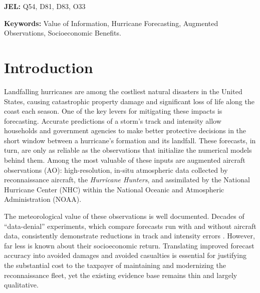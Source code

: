 \documentclass[12pt]{article}%
\begin{document}
\begin{titlepage}


\noindent\textbf{JEL:} Q54, D81, D83, O33

\vspace{.6cm}

\noindent\textbf{Keywords:} Value of Information, Hurricane Forecasting, Augmented Observations, Socioeconomic Benefits.
\setcounter{footnote}{0}


\end{titlepage}

\newpage
 \FloatBarrier
\section{Introduction} \label{sec:intro}

Landfalling hurricanes are among the costliest natural disasters in the United States, causing catastrophic property damage and significant loss of life along the coast each season. One of the key levers for mitigating these impacts is forecasting. Accurate predictions of a storm's track and intensity allow households and government agencies to make better protective decisions in the short window between a hurricane's formation and its landfall. These forecasts, in turn, are only as reliable as the observations that initialize the numerical models behind them. Among the most valuable of these inputs are augmented aircraft observations (AO): high-resolution, in-situ atmospheric data collected by reconnaissance aircraft, the \emph{Hurricane Hunters}, and assimilated by the National Hurricane Center (NHC) within the National Oceanic and Atmospheric Administration (NOAA).

The meteorological value of these observations is well documented. Decades of ``data-denial'' experiments, which compare forecasts run with and without aircraft data, consistently demonstrate reductions in track and intensity errors \citep{Majumdar2016}. However, far less is known about their socioeconomic return. Translating improved forecast accuracy into avoided damages and avoided casualties is essential for justifying the substantial cost to the taxpayer of maintaining and modernizing the reconnaissance fleet, yet the existing evidence base remains thin and largely qualitative.
\end{document}
